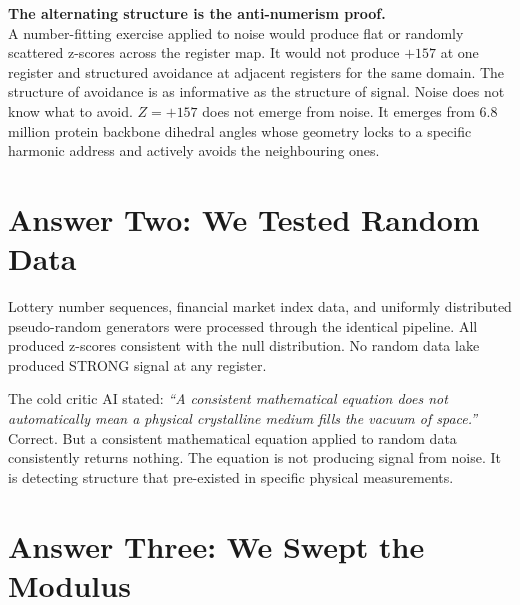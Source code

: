 \documentclass[11pt, letterpaper, openany]{book}
\begin{document}
\begin{refutebox}
\textbf{The alternating structure is the anti-numerism proof.}\\[0.5em]
A number-fitting exercise applied to noise would produce flat or
randomly scattered z-scores across the register map. It would not
produce $+157$ at one register and structured avoidance at
adjacent registers for the same domain. The structure of avoidance
is as informative as the structure of signal. Noise does not know
what to avoid. $Z = +157$ does not emerge from noise.
It emerges from 6.8 million protein backbone dihedral angles
whose geometry locks to a specific harmonic address and actively
avoids the neighbouring ones.
\end{refutebox}
 

\section{Answer Two: We Tested Random Data}

Lottery number sequences, financial market index data, and uniformly
distributed pseudo-random generators were processed through the
identical pipeline. All produced z-scores consistent with the
null distribution. No random data lake produced STRONG signal
at any register.

The cold critic AI stated: \textit{``A consistent mathematical
equation does not automatically mean a physical crystalline medium
fills the vacuum of space.''} Correct. But a consistent mathematical
equation applied to random data consistently returns nothing.
The equation is not producing signal from noise. It is detecting
structure that pre-existed in specific physical measurements.

\section{Answer Three: We Swept the Modulus}
\end{document}
